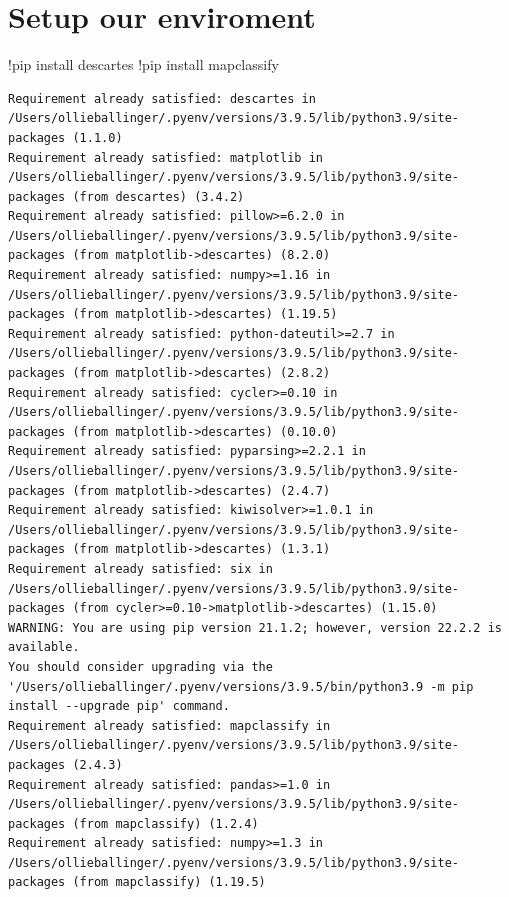 \documentclass[
  letterpaper,
  DIV=11,
  numbers=noendperiod]{scrreprt}
\newenvironment{Shaded}{\begin{snugshade}}{\end{snugshade}}
\newcommand{\NormalTok}[1]{\textcolor[rgb]{0.00,0.23,0.31}{#1}}
\newcommand{\OperatorTok}[1]{\textcolor[rgb]{0.37,0.37,0.37}{#1}}
\begin{document}
\hypertarget{setup-our-enviroment}{%
\section{Setup our enviroment}\label{setup-our-enviroment}}

\begin{Shaded}
\begin{Highlighting}[]
\OperatorTok{!}\NormalTok{pip install descartes}
\OperatorTok{!}\NormalTok{pip install mapclassify}
\end{Highlighting}
\end{Shaded}

\begin{verbatim}
Requirement already satisfied: descartes in /Users/ollieballinger/.pyenv/versions/3.9.5/lib/python3.9/site-packages (1.1.0)
Requirement already satisfied: matplotlib in /Users/ollieballinger/.pyenv/versions/3.9.5/lib/python3.9/site-packages (from descartes) (3.4.2)
Requirement already satisfied: pillow>=6.2.0 in /Users/ollieballinger/.pyenv/versions/3.9.5/lib/python3.9/site-packages (from matplotlib->descartes) (8.2.0)
Requirement already satisfied: numpy>=1.16 in /Users/ollieballinger/.pyenv/versions/3.9.5/lib/python3.9/site-packages (from matplotlib->descartes) (1.19.5)
Requirement already satisfied: python-dateutil>=2.7 in /Users/ollieballinger/.pyenv/versions/3.9.5/lib/python3.9/site-packages (from matplotlib->descartes) (2.8.2)
Requirement already satisfied: cycler>=0.10 in /Users/ollieballinger/.pyenv/versions/3.9.5/lib/python3.9/site-packages (from matplotlib->descartes) (0.10.0)
Requirement already satisfied: pyparsing>=2.2.1 in /Users/ollieballinger/.pyenv/versions/3.9.5/lib/python3.9/site-packages (from matplotlib->descartes) (2.4.7)
Requirement already satisfied: kiwisolver>=1.0.1 in /Users/ollieballinger/.pyenv/versions/3.9.5/lib/python3.9/site-packages (from matplotlib->descartes) (1.3.1)
Requirement already satisfied: six in /Users/ollieballinger/.pyenv/versions/3.9.5/lib/python3.9/site-packages (from cycler>=0.10->matplotlib->descartes) (1.15.0)
WARNING: You are using pip version 21.1.2; however, version 22.2.2 is available.
You should consider upgrading via the '/Users/ollieballinger/.pyenv/versions/3.9.5/bin/python3.9 -m pip install --upgrade pip' command.
Requirement already satisfied: mapclassify in /Users/ollieballinger/.pyenv/versions/3.9.5/lib/python3.9/site-packages (2.4.3)
Requirement already satisfied: pandas>=1.0 in /Users/ollieballinger/.pyenv/versions/3.9.5/lib/python3.9/site-packages (from mapclassify) (1.2.4)
Requirement already satisfied: numpy>=1.3 in /Users/ollieballinger/.pyenv/versions/3.9.5/lib/python3.9/site-packages (from mapclassify) (1.19.5)

\end{verbatim}
\end{document}
